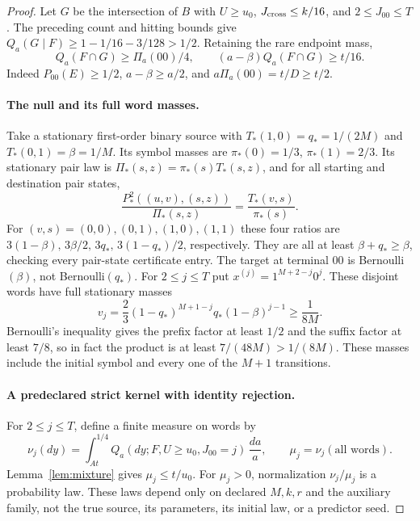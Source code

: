 \begin{proof}
Let $G$ be the intersection of $B$ with
$U\ge u_0$, $J_{\rm cross}\le k/16$, and $2\le J_{00}\le T$.
The preceding count and hitting bounds give
$Q_a(G\mid F)\ge1-1/16-3/128>1/2$. Retaining the rare endpoint mass,
\begin{equation}
 Q_a(F\cap G)\ge\Pi_a(00)/4,\qquad
 (a-\beta)Q_a(F\cap G)\ge t/16.
 \label{eq:good-event-mass}
\end{equation}
Indeed $P_{00}(E)\ge1/2$, $a-\beta\ge a/2$, and
$a\Pi_a(00)=t/D\ge t/2$.

\paragraph{The null and its full word masses.}
Take a stationary first-order binary source with
$T_*(1,0)=q_*=1/(2M)$ and $T_*(0,1)=\beta=1/M$.
Its symbol masses are $\pi_*(0)=1/3$, $\pi_*(1)=2/3$.
Its stationary pair law is $\Pi_*(s,z)=\pi_*(s)T_*(s,z)$, and
for all starting and destination pair states,
\[
 \frac{P_*^2((u,v),(s,z))}{\Pi_*(s,z)}
 =\frac{T_*(v,s)}{\pi_*(s)}.
\]
For $(v,s)=(0,0),(0,1),(1,0),(1,1)$ these four ratios are
$3(1-\beta),\,3\beta/2,\,3q_*,\,3(1-q_*)/2$, respectively.
They are all at least $\beta+q_*\ge\beta$, checking every pair-state
certificate entry. The target at terminal $00$ is Bernoulli$(\beta)$,
not Bernoulli$(q_*)$.
For $2\le j\le T$ put $x^{(j)}=1^{M+2-j}0^j$.
These disjoint words have full stationary masses
\begin{equation}
 v_j=\frac23(1-q_*)^{M+1-j}q_*(1-\beta)^{j-1}
 \ge\frac1{8M}. \label{eq:null-word-masses}
\end{equation}
Bernoulli's inequality gives the prefix factor at least $1/2$ and
the suffix factor at least $7/8$, so in fact the product is at least
$7/(48M)>1/(8M)$. These masses include the initial symbol and every
one of the $M+1$ transitions.

\paragraph{A predeclared strict kernel with identity rejection.}
For $2\le j\le T$, define a finite measure on words by
\[
 \nu_j(dy)=\int_{At}^{1/4}
       Q_a(dy;F,U\ge u_0,J_{00}=j)\,\frac{da}{a},
 \qquad \mu_j=\nu_j(\text{all words}).
\]
Lemma~\ref{lem:mixture} gives $\mu_j\le t/u_0$.
For $\mu_j>0$, normalization $\nu_j/\mu_j$ is a probability law.
These laws depend only on declared $M,k,r$ and the auxiliary family,
not the true source, its parameters, its initial law, or a predictor seed.


\end{proof}
